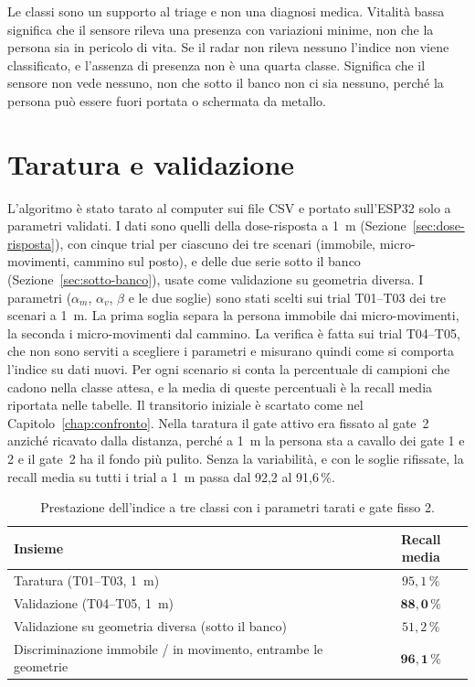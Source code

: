 Le classi sono un supporto al triage e non una diagnosi medica. Vitalità bassa significa che il sensore rileva una presenza con variazioni minime, non che la persona sia in pericolo di vita. Se il radar non rileva nessuno l'indice non viene classificato, e l'assenza di presenza non è una quarta classe. Significa che il sensore non vede nessuno, non che sotto il banco non ci sia nessuno, perché la persona può essere fuori portata o schermata da metallo.

\section{Taratura e validazione}
\label{sec:vitalita-taratura}

L'algoritmo è stato tarato al computer sui file CSV e portato sull'ESP32 solo a parametri validati. I dati sono quelli della dose-risposta a 1~m (Sezione~\ref{sec:dose-risposta}), con cinque trial per ciascuno dei tre scenari (immobile, micro-movimenti, cammino sul posto), e delle due serie sotto il banco (Sezione~\ref{sec:sotto-banco}), usate come validazione su geometria diversa. I parametri ($\alpha_m$, $\alpha_v$, $\beta$ e le due soglie) sono stati scelti sui trial T01--T03 dei tre scenari a 1~m. La prima soglia separa la persona immobile dai micro-movimenti, la seconda i micro-movimenti dal cammino. La verifica è fatta sui trial T04--T05, che non sono serviti a scegliere i parametri e misurano quindi come si comporta l'indice su dati nuovi. Per ogni scenario si conta la percentuale di campioni che cadono nella classe attesa, e la media di queste percentuali è la recall media riportata nelle tabelle. Il transitorio iniziale è scartato come nel Capitolo~\ref{chap:confronto}. Nella taratura il gate attivo era fissato al gate~2 anziché ricavato dalla distanza, perché a 1~m la persona sta a cavallo dei gate 1 e 2 e il gate~2 ha il fondo più pulito. Senza la variabilità, e con le soglie rifissate, la recall media su tutti i trial a 1~m passa dal 92,2 al 91,6\,\%.

\begin{table}[htbp]
\centering
\caption{Prestazione dell'indice a tre classi con i parametri tarati e gate fisso 2.}
\label{tab:vitalita-validazione}
\small
\begin{tabular}{@{}lc@{}}
\toprule
Insieme & Recall media \\
\midrule
Taratura (T01--T03, 1~m) & $95{,}1\,\%$ \\
Validazione (T04--T05, 1~m) & $\mathbf{88{,}0\,\%}$ \\
Validazione su geometria diversa (sotto il banco) & $51{,}2\,\%$ \\
\midrule
Discriminazione immobile / in movimento, entrambe le geometrie & $\mathbf{96{,}1\,\%}$ \\
\bottomrule
\end{tabular}
\end{table}

